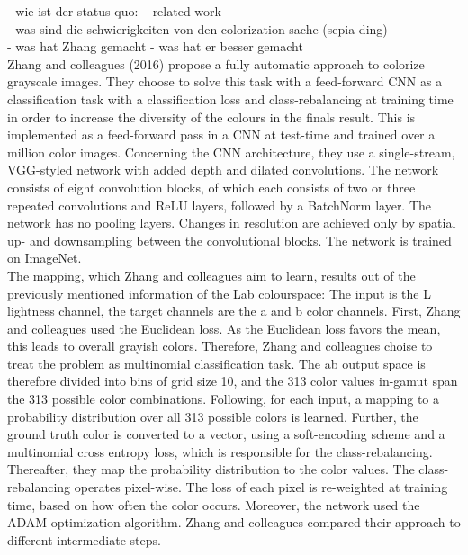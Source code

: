 \documentclass[12pt,letterpaper]{article}
\begin{document}
- wie ist der status quo: -- related work\\
- was sind die schwierigkeiten von den colorization sache (sepia ding)\\
- was hat Zhang gemacht - was hat er besser gemacht\\
Zhang and colleagues (2016) propose a fully automatic approach to colorize grayscale images. They choose
to solve this task with a feed-forward CNN as a classification task with a classification loss and class-rebalancing at training time in order to increase the
diversity of the colours in the finals result. This is implemented as a feed-forward pass in a CNN at test-time and trained over a million color images. Concerning the
CNN architecture, they use a single-stream, VGG-styled network with added depth and dilated convolutions. The network consists of eight convolution blocks, of which each consists
of two or three repeated convolutions and ReLU layers, followed by a BatchNorm layer. The network has no pooling layers. Changes in resolution are achieved only by spatial up- and
downsampling between the convolutional blocks. The network is trained on ImageNet.\\
The mapping, which Zhang and colleagues aim to learn, results out of the previously mentioned information of the Lab colourspace: The input is the L lightness channel, the target channels
are the a and b color channels. First, Zhang and colleagues used the Euclidean loss. As the Euclidean loss favors the mean, this leads to overall grayish colors.
Therefore, Zhang and colleagues choise to treat the problem as multinomial classification task. The ab output space is therefore divided into bins of grid size 10, and the 313 color values in-gamut
span the 313 possible color combinations. Following, for each input, a mapping to a probability distribution over all 313 possible colors is learned.  Further, the ground truth color
is converted to a vector, using a soft-encoding scheme and a multinomial cross entropy loss, which is responsible for the class-rebalancing. Thereafter, they map the probability
distribution to the color values. The class-rebalancing operates pixel-wise. The loss of each pixel is re-weighted at training time, based on how often the color occurs. Moreover, the network
used the ADAM optimization algorithm. Zhang and colleagues compared their approach to different intermediate steps.
\end{document}
